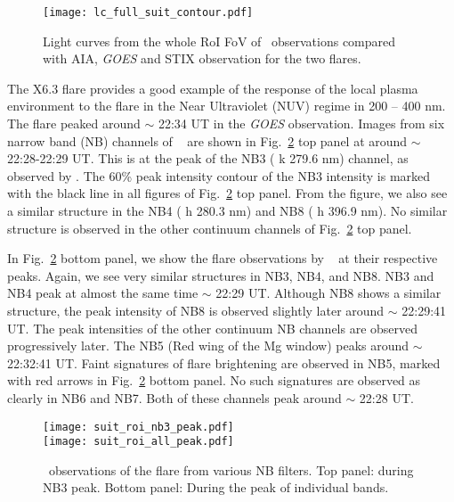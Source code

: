 \begin{figure}[ht!]
    \centering
    \texttt{[image: lc\_full\_suit\_contour.pdf]}
    \caption{Light curves from the whole RoI FoV of \suit~observations compared with AIA, {\it GOES} and STIX observation for the two flares.}
    \label{fig:flare_full}
\end{figure}

The X6.3 flare provides a good example of the response of the local plasma environment to the flare in the Near Ultraviolet (NUV) regime in 200 {--} 400 nm. The flare peaked around $\sim$ 22:34 UT in the {\it GOES} observation. Images from six narrow band (NB) channels of \suit~ are shown in Fig.~\ref{fig:flare_nb3_peak} top panel at around $\sim$ 22:28-22:29 UT. This is at the peak of the NB3 ( k 279.6 nm) channel, as observed by \suit. The 60\% peak intensity contour of the NB3 intensity is marked with the black line in all figures of Fig.~\ref{fig:flare_nb3_peak} top panel. From the figure, we also see a similar structure in the NB4 ( h 280.3 nm) and NB8 ( h 396.9 nm). No similar structure is observed in the other continuum channels of Fig.~\ref{fig:flare_nb3_peak} top panel.

In Fig.~\ref{fig:flare_nb3_peak} bottom panel, we show the flare observations by \suit~ at their respective peaks. Again, we see very similar structures in NB3, NB4, and NB8. NB3 and NB4 peak at almost the same time $\sim$ 22:29 UT. Although NB8 shows a similar structure, the peak intensity of NB8 is observed slightly later around $\sim$ 22:29:41 UT. The peak intensities of the other continuum NB channels are observed progressively later. The NB5 (Red wing of the Mg window) peaks around $\sim$ 22:32:41 UT. Faint signatures of flare brightening are observed in NB5, marked with red arrows in Fig.~\ref{fig:flare_nb3_peak} bottom panel. No such signatures are observed as clearly in NB6 and NB7. Both of these channels peak around $\sim$ 22:28 UT.

\begin{figure}[ht!]
    \centering
    \texttt{[image: suit\_roi\_nb3\_peak.pdf]} \\
    \texttt{[image: suit\_roi\_all\_peak.pdf]}
    \caption[{\suit} observations of the February 22nd, 2024 flare from various NB filters.]{\suit~observations of the flare from various NB filters. Top panel: during NB3 peak. Bottom panel: During the peak of individual bands.}
    \label{fig:flare_nb3_peak}
\end{figure}

